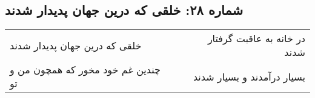 \begin{center}
\section*{شماره ۲۸: خلقی که درین جهان پدیدار شدند}
\label{sec:028}
\begin{longtable}{l p{0.5cm} r}
خلقی که درین جهان پدیدار شدند
&&
در خانه به عاقبت گرفتار شدند
\\
چندین غم خود مخور که همچون من و تو
&&
بسیار درآمدند و بسیار شدند
\\
\end{longtable}
\end{center}

